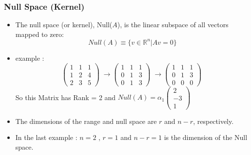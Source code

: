 \documentclass{beamer}
\begin{document}
\begin{frame}
	\frametitle{Null Space (Kernel)}
         \begin{itemize}
		 \item The null space (or kernel), Null($A$), is the linear subspace of all vectors mapped to zero:
			 $$ Null(A) \equiv \{v \in \mathbb{R}^{n} | Av = 0 \} $$
		 \pause
		 \item example : 
			 $$
			 \begin{pmatrix} 1 & 1 & 1 \\ 1 & 2 & 4 \\ 2 & 3 & 5 \end{pmatrix} \; 
				 \rightarrow
			 \begin{pmatrix} 1 & 1 & 1 \\ 0 & 1 & 3 \\ 0 & 1 & 3 \end{pmatrix} \; 
		         \rightarrow
		         \begin{pmatrix} 1 & 1 & 1 \\ 0 & 1 & 3 \\ 0 & 0 & 0 \end{pmatrix} \; $$
		 \pause
				 So this Matrix has Rank = 2 and $ Null(A) = \alpha_1 \begin{pmatrix} 2\\ -3 \\ 1 \end{pmatrix} \; $

	 \end{itemize}
\end{frame}
\begin{frame}
	\begin{itemize}		
		\item The dimensions of the range and null space are $r$ and $n - r$, respectively.
		\item In the last example :
			$ n = 2 $ , $ r = 1$ and $ n - r = 1$ is the dimension of the Null space.
	\end{itemize}
\end{frame}
\end{document}
